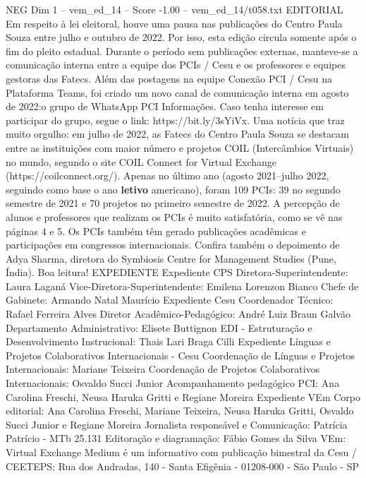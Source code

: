 \begin{textsample}{NEG Dim 1 – vem\_ed\_14 – Score -1.00 – vem\_ed\_14/t058.txt}  \label{ex:f1_neg_019}
EDITORIAL Em respeito à lei eleitoral, houve uma pausa nas publicações do Centro Paula Souza entre julho e outubro de 2022.
Por isso, esta edição circula somente após o fim do pleito estadual.
Durante o período sem publicações externas, manteve-se a comunicação interna entre a equipe dos PCIs / Cesu e os professores e equipes gestoras das Fatecs.
Além das postagens na equipe Conexão PCI / Cesu na Plataforma Teams, foi criado um novo canal de comunicação interna em agosto de 2022:o grupo de WhatsApp PCI Informações.
Caso tenha interesse em participar do grupo, segue o link: https://bit.ly/3sYiVx.
Uma notícia que traz muito orgulho: em julho de 2022, as Fatecs do Centro Paula Souza se destacam entre as instituições com maior número e projetos COIL (Intercâmbios Virtuais) no mundo, segundo o site COIL Connect for Virtual Exchange (https://coilconnect.org/).
Apenas no último ano (agosto 2021–julho 2022, seguindo como base o ano \textbf{letivo} americano), foram 109 PCIs: 39 no segundo semestre de 2021 e 70 projetos no primeiro semestre de 2022.
A percepção de alunos e professores que realizam os PCIs é muito satisfatória, como se vê nas páginas 4 e 5.
Os PCIs também têm gerado publicações acadêmicas e participações em congressos internacionais.
Confira também o depoimento de Adya Sharma, diretora do Symbiosis Centre for Management Studies (Pune, Índia).
Boa leitura!
EXPEDIENTE Expediente CPS Diretora-Superintendente: Laura Laganá Vice-Diretora-Superintendente: Emilena Lorenzon Bianco Chefe de Gabinete: Armando Natal Maurício Expediente Cesu Coordenador Técnico: Rafael Ferreira Alves Diretor Acadêmico-Pedagógico: André Luiz Braun Galvão Departamento Administrativo: Elisete Buttignon EDI - Estruturação e Desenvolvimento Instrucional: Thais Lari Braga Cilli Expediente Línguas e Projetos Colaborativos Internacionais - Cesu Coordenação de Línguas e Projetos Internacionais: Mariane Teixeira Coordenação de Projetos Colaborativos Internacionais: Osvaldo Succi Junior Acompanhamento pedagógico PCI: Ana Carolina Freschi, Neusa Haruka Gritti e Regiane Moreira Expediente VEm Corpo editorial: Ana Carolina Freschi, Mariane Teixeira, Neusa Haruka Gritti, Osvaldo Succi Junior e Regiane Moreira Jornalista responsável e Comunicação: Patrícia Patrício - MTb 25.131 Editoração e diagramação: Fábio Gomes da Silva VEm: Virtual Exchange Medium é um informativo com publicação bimestral da Cesu / CEETEPS: Rua dos Andradas, 140 - Santa Efigênia - 01208-000 - São Paulo - SP

\end{textsample}
